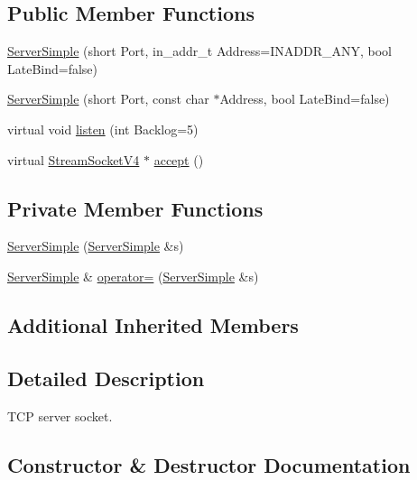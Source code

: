 \subsection*{Public Member Functions}
\begin{DoxyCompactItemize}
\item 
\hyperlink{classServerSimple_a9ed49ad0f3ebaaae208886c472d06827}{Server\+Simple} (short Port, in\+\_\+addr\+\_\+t Address=I\+N\+A\+D\+D\+R\+\_\+\+A\+NY, bool Late\+Bind=false)
\item 
\hyperlink{classServerSimple_a47713f4385917c592b2db4236b27e20e}{Server\+Simple} (short Port, const char $\ast$Address, bool Late\+Bind=false)
\item 
virtual void \hyperlink{classServerSimple_ae2c87189faf4d3b0c87e160bd561be05}{listen} (int Backlog=5)
\item 
virtual \hyperlink{classStreamSocketV4}{Stream\+Socket\+V4} $\ast$ \hyperlink{classServerSimple_ad1494d88a28fdb9c392ed9b03172fdfd}{accept} ()
\end{DoxyCompactItemize}
\subsection*{Private Member Functions}
\begin{DoxyCompactItemize}
\item 
\hyperlink{classServerSimple_a8e89675d8a51130655cf8060d203c287}{Server\+Simple} (\hyperlink{classServerSimple}{Server\+Simple} \&s)
\item 
\hyperlink{classServerSimple}{Server\+Simple} \& \hyperlink{classServerSimple_a2c144e6e1b4a58b4edd838db998f5903}{operator=} (\hyperlink{classServerSimple}{Server\+Simple} \&s)
\end{DoxyCompactItemize}
\subsection*{Additional Inherited Members}


\subsection{Detailed Description}
T\+CP server socket. 

\subsection{Constructor \& Destructor Documentation}
\mbox{\label{classServerSimple_a9ed49ad0f3ebaaae208886c472d06827}} 
